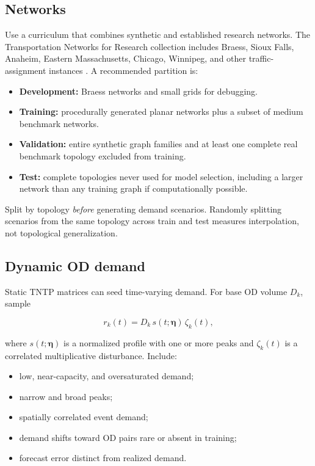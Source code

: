 \documentclass[11pt]{article}
\newcommand{\vect}[1]{\bm{#1}}
\begin{document}
\subsection{Networks}

Use a curriculum that combines synthetic and established research networks.  The
Transportation Networks for Research collection includes Braess, Sioux Falls, Anaheim,
Eastern Massachusetts, Chicago, Winnipeg, and other traffic-assignment instances
\citep{transportationNetworks}.  A recommended partition is:

\begin{itemize}[leftmargin=1.5em]
  \item \textbf{Development:} Braess networks and small grids for debugging.
  \item \textbf{Training:} procedurally generated planar networks plus a subset of
  medium benchmark networks.
  \item \textbf{Validation:} entire synthetic graph families and at least one complete
  real benchmark topology excluded from training.
  \item \textbf{Test:} complete topologies never used for model selection, including a
  larger network than any training graph if computationally possible.
\end{itemize}

Split by topology \emph{before} generating demand scenarios.  Randomly splitting
scenarios from the same topology across train and test measures interpolation, not
topological generalization.

\subsection{Dynamic OD demand}

Static TNTP matrices can seed time-varying demand.  For base OD volume \(D_k\), sample

\begin{equation}
  r_k(t)
  = D_k\,s(t;\vect{\eta})\,\zeta_k(t),
  \label{eq:demand}
\end{equation}

where \(s(t;\vect{\eta})\) is a normalized profile with one or more peaks and
\(\zeta_k(t)\) is a correlated multiplicative disturbance.  Include:

\begin{itemize}[leftmargin=1.5em]
  \item low, near-capacity, and oversaturated demand;
  \item narrow and broad peaks;
  \item spatially correlated event demand;
  \item demand shifts toward OD pairs rare or absent in training;
  \item forecast error distinct from realized demand.
\end{itemize}
\end{document}
